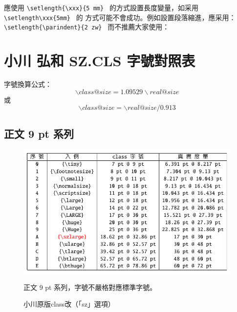 \par 應使用 \verb+\setlength{\xxx}{5 mm} + 的方式設置長度變量，如采用\verb+\setlength\xxx{5mm} + 的
方式可能不會成功。例如設置段落縮進，應采用：{\verb+ \setlength{\parindent}{2 zw} + }
而不推薦大家使用：\\
{\uwave{\color{red}\verb+ \setlength\parindent{2 zw} + }}

\clearpage
\section{小川 弘和 SZ.CLS 字號對照表}\label{sec:intro}

\par 字號換算公式：
\[ \backslash class@size = 1.09529 \backslash real@size \]
或
\[ \backslash class@size = \backslash real@size/0.913 \]

\subsection{正文 9 pt 系列}
\begin{figure}[H]
\begin{center}
\caption{小川原版class改（「sz」選項）}
{ \includegraphics[scale=1]{figures/sz.pdf}}
\end{center}
\par 正文 9 pt 系列，字號不嚴格對應標準字號。
\end{figure}

